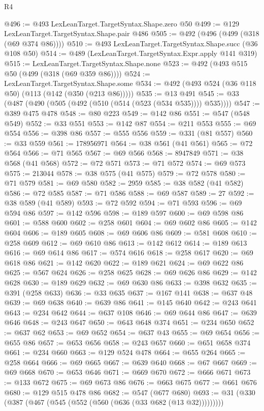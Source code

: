 \begin{lexlean}{R4}
\begin{coremodule}
@496 := @493 LexLeanTarget.TargetSyntax.Shape.zero @50
@499 := @129 LexLeanTarget.TargetSyntax.Shape.pair @486
@505 := @492 (@496 (@499 (@318 (@69 @374 @86))))
@510 := @493 LexLeanTarget.TargetSyntax.Shape.succ (@36 @108 @50)
@514 := @489 (LexLeanTarget.TargetSyntax.Expr.apply @141 @319)
@515 := LexLeanTarget.TargetSyntax.Shape.none
@523 := @492 (@493 @515 @50 (@499 (@318 (@69 @359 @86))))
@524 := LexLeanTarget.TargetSyntax.Shape.some
@534 := @492 (@493 @524 (@36 @118 @50) (@113 (@142 (@350 (@213 @86)))))
@535 := @13 @491
@545 := @33 (@487 (@490 (@505 (@492 (@510 (@514 (@523 (@534 @535)))) @535))))
@547 := @389 @475 @478
@548 := @80 @223
@549 := @142 @86
@551 := @547 (@548 @549)
@552 := @33 @551
@553 := @142 @87
@554 := @211 @553
@555 := @69 @554
@556 := @398 @86
@557 := @555 @556
@559 := @331 (@81 @557)
@560 := @33 @559
@561 := 178956971
@564 := @38 @561 (@41 @561)
@565 := @72 @564
@566 := @71 @565
@567 := @69 @566
@568 := 8947849
@571 := @38 @568 (@41 @568)
@572 := @72 @571
@573 := @71 @572
@574 := @69 @573
@575 := 213044
@578 := @38 @575 (@41 @575)
@579 := @72 @578
@580 := @71 @579
@581 := @69 @580
@582 := 2959
@585 := @38 @582 (@41 @582)
@586 := @72 @585
@587 := @71 @586
@588 := @69 @587
@589 := 27
@592 := @38 @589 (@41 @589)
@593 := @72 @592
@594 := @71 @593
@596 := @69 @594 @86
@597 := @142 @596
@598 := @189 @597
@600 := @69 @598 @86
@601 := @588 @600
@602 := @258 @601
@604 := @69 @602 @86
@605 := @142 @604
@606 := @189 @605
@608 := @69 @606 @86
@609 := @581 @608
@610 := @258 @609
@612 := @69 @610 @86
@613 := @142 @612
@614 := @189 @613
@616 := @69 @614 @86
@617 := @574 @616
@618 := @258 @617
@620 := @69 @618 @86
@621 := @142 @620
@622 := @189 @621
@624 := @69 @622 @86
@625 := @567 @624
@626 := @258 @625
@628 := @69 @626 @86
@629 := @142 @628
@630 := @189 @629
@632 := @69 @630 @86
@633 := @398 @632
@635 := @391 (@258 @633)
@636 := @33 @635
@637 := @167 @141
@638 := @637 @48
@639 := @69 @638
@640 := @639 @86
@641 := @145 @640
@642 := @243 @641
@643 := @234 @642
@644 := @637 @108
@646 := @69 @644 @86
@647 := @639 @646
@648 := @243 @647
@650 := @643 @648 @374
@651 := @234 @650
@652 := @637 @62
@653 := @69 @652
@654 := @637 @43
@655 := @69 @654
@656 := @655 @86
@657 := @653 @656
@658 := @243 @657
@660 := @651 @658 @374
@661 := @234 @660
@663 := @129 @524 @478
@664 := @655 @264
@665 := @258 @664
@666 := @69 @665
@667 := @639 @640
@668 := @67 @667
@669 := @69 @668
@670 := @653 @646
@671 := @669 @670
@672 := @666 @671
@673 := @133 @672
@675 := @69 @673 @86
@676 := @663 @675
@677 := @661 @676
@680 := @129 @515 @478 @86
@682 := @547 (@677 @680)
@693 := @31 (@330 (@387 (@467 (@545 (@552 (@560 (@636 (@33 @682 (@13 @32)))))))))

\end{coremodule}
\end{lexlean}
